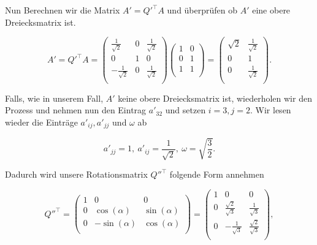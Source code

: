 Nun Berechnen wir die Matrix \( A' = Q'^\top A \) und überprüfen ob \( A' \) eine obere Dreiecksmatrix ist.

\begin{equation*}
    A' = Q'^\top A = 
    \begin{pmatrix}
        \frac{1}{\sqrt{2}} & 0 & \frac{1}{\sqrt{2}} \\
        0 & 1 & 0 \\
        -\frac{1}{\sqrt{2}} & 0 & \frac{1}{\sqrt{2}} \\
    \end{pmatrix}
    \begin{pmatrix}
        1 & 0 \\
        0 & 1 \\
        1 & 1 \\
    \end{pmatrix} = 
    \begin{pmatrix}
        \sqrt{2} & \frac{1}{\sqrt{2}} \\
        0 & 1 \\
        0 & \frac{1}{\sqrt{2}} \\
    \end{pmatrix}.
\end{equation*}

Falls, wie in unserem Fall, \( A' \) keine obere Dreiecksmatrix ist, wiederholen wir den Prozess und nehmen nun den Eintrag \( a'_{32} \) und setzen \( i = 3, j = 2 \). Wir lesen wieder die Einträge \( a'_{ij}, a'_{jj} \) und \( \omega \) ab

\begin{equation*}
    a'_{jj} = 1, \ a'_{ij} = \frac{1}{\sqrt{2}}, \ \omega = \sqrt{\frac{3}{2}}.
\end{equation*}

Dadurch wird unsere Rotationsmatrix \( Q''^\top \) folgende Form annehmen

\begin{equation*}
    Q''^\top = \begin{pmatrix}
        1 & 0 & 0 \\
        0 & \cos(\alpha) & \sin(\alpha) \\
        0 & -\sin(\alpha) & \cos(\alpha) \\
    \end{pmatrix} =
    \begin{pmatrix}
        1 & 0 & 0 \\
        0 & \frac{\sqrt{2}}{\sqrt{3}} & \frac{1}{\sqrt{3}} \\
        0 & -\frac{1}{\sqrt{3}} & \frac{\sqrt{2}}{\sqrt{3}} \\
    \end{pmatrix},
\end{equation*}

